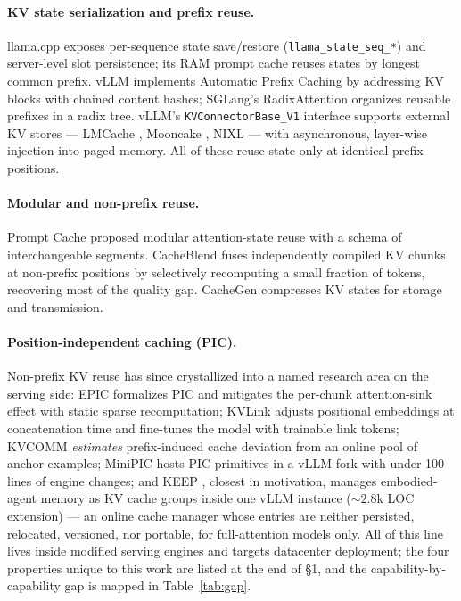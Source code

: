 \documentclass[11pt]{article}
\newcommand{\code}[1]{\texttt{#1}}
\begin{document}
\paragraph{KV state serialization and prefix reuse.}
llama.cpp exposes per-sequence state save/restore (\code{llama\_state\_seq\_*}) and server-level slot persistence; its RAM prompt cache reuses states by longest common prefix. vLLM \citep{kwon2023} implements Automatic Prefix Caching by addressing KV blocks with chained content hashes; SGLang's RadixAttention \citep{zheng2024} organizes reusable prefixes in a radix tree. vLLM's \code{KVConnectorBase\_V1} interface supports external KV stores --- LMCache \citep{lmcache2024}, Mooncake \citep{qin2025}, NIXL --- with asynchronous, layer-wise injection into paged memory. All of these reuse state only at identical prefix positions.

\paragraph{Modular and non-prefix reuse.}
Prompt Cache \citep{gim2024} proposed modular attention-state reuse with a schema of interchangeable segments. CacheBlend \citep{yao2025} fuses independently compiled KV chunks at non-prefix positions by selectively recomputing a small fraction of tokens, recovering most of the quality gap. CacheGen \citep{liu2024} compresses KV states for storage and transmission.

\paragraph{Position-independent caching (PIC).}
Non-prefix KV reuse has since crystallized into a named research area on the serving side: EPIC \citep{hu2025} formalizes PIC and mitigates the per-chunk attention-sink effect with static sparse recomputation; KVLink \citep{yangj2025} adjusts positional embeddings at concatenation time and fine-tunes the model with trainable link tokens; KVCOMM \citep{ye2025} \emph{estimates} prefix-induced cache deviation from an online pool of anchor examples; MiniPIC \citep{ordonez2026} hosts PIC primitives in a vLLM fork with under 100 lines of engine changes; and KEEP \citep{yangz2026}, closest in motivation, manages embodied-agent memory as KV cache groups inside one vLLM instance (${\sim}2.8$k LOC extension) --- an online cache manager whose entries are neither persisted, relocated, versioned, nor portable, for full-attention models only. All of this line lives inside modified serving engines and targets datacenter deployment; the four properties unique to this work are listed at the end of \S1, and the capability-by-capability gap is mapped in Table~\ref{tab:gap}.
\end{document}
